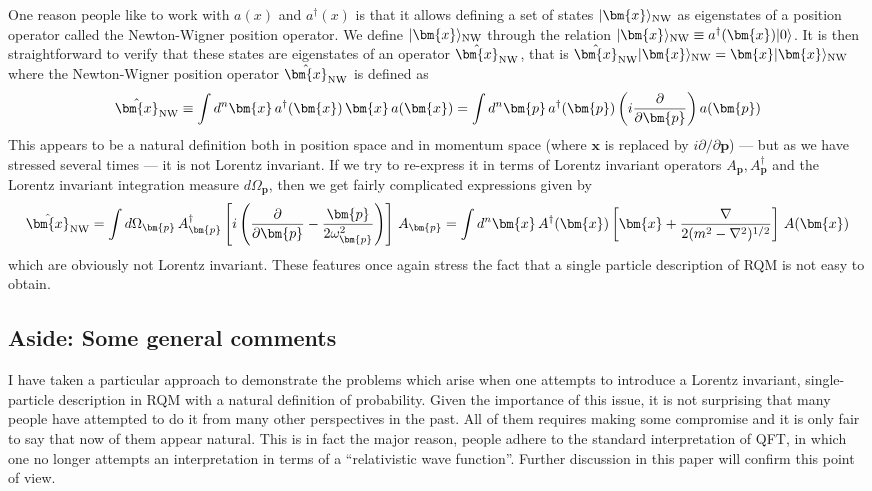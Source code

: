 \documentclass[12pt]{article}
\def\ket#1{|#1\rangle}                    %
\begin{document}
 One reason people like to work with $a(x)$ and $a^\dagger(x)$ is that it allows defining a set of states $\ket{\bm{x}}_{\rm NW}$ as  eigenstates of a position operator called the Newton-Wigner position operator.  We define  $\ket{\bm{x}}_{\rm NW}$ through the relation 
 $
 \ket{\bm{x}}_{\rm NW} \equiv a^\dagger (\bm{x})\ket{0}
 $. It is then straightforward to verify that these states are eigenstates of an operator $\hat{\bm{x}}_{\rm NW}$, that is 
 $
 \hat{\bm{x}}_{\rm NW} \ket{\bm{x}}_{\rm NW} = \bm{x}\ket{\bm{x}}_{\rm NW}
 $
 where the Newton-Wigner position operator $\hat{\bm{x}}_{\rm NW}$ is defined as 
 \begin{equation}
 \hat{\bm{x}}_{\rm NW} \equiv \int d^n \bm{x}\, a^\dagger(\bm{x})\, \bm{x}\, a(\bm{x}) = \int d^n \bm{p}\, a^\dagger(\bm{p}) \left(i\frac{\partial}{\partial \bm{p}}\right) a(\bm{p})
 \end{equation} 
 This appears to be a natural definition both in position space and in momentum space (where $\bm{x}$ is replaced by $i\partial/\partial \bm{p}$) --- but as we have stressed several times --- it is not Lorentz invariant. If we try to re-express it in terms of Lorentz invariant operators $A_{\bm{p}}, A^\dagger_{\bm{p}}$ and the Lorentz invariant integration measure $d\Omega_{\bm{p}}$, then we get fairly complicated expressions given by
 \begin{equation}
 \hat{\bm{x}}_{\rm NW} = \int d\Omega_{\bm{p}} \, A^\dagger_{\bm{p}} \left[ i \left(\frac{\partial}{\partial \bm{p}} - \frac{\bm{p}}{2\omega_{\bm{p}}^2}\right)\right]\, A_{\bm{p}} = \int d^n \bm{x}\, A^\dagger(\bm{x}) \left[ \bm{x} + \frac{\nabla}{2(m^2 - \nabla^2)^{1/2}}\right] \, A(\bm{x})
 \end{equation} 
 which are obviously not Lorentz invariant. These features once again stress the fact that a single particle description of RQM is not easy to obtain. 

 \subsection{Aside: Some general comments}

I have taken a particular approach to demonstrate the problems which arise when one attempts to introduce a Lorentz invariant, single-particle description in RQM with a natural definition of probability. Given the importance of this issue, it is not surprising that many people have attempted to do it from many other perspectives in the past. All of them requires making some compromise and it is only fair to say that now of them appear natural. This is in fact the major reason, people adhere to the standard interpretation of QFT, in which one no longer attempts an interpretation in terms of a ``relativistic wave function''. Further discussion in this paper will confirm this point of view.
\end{document}
